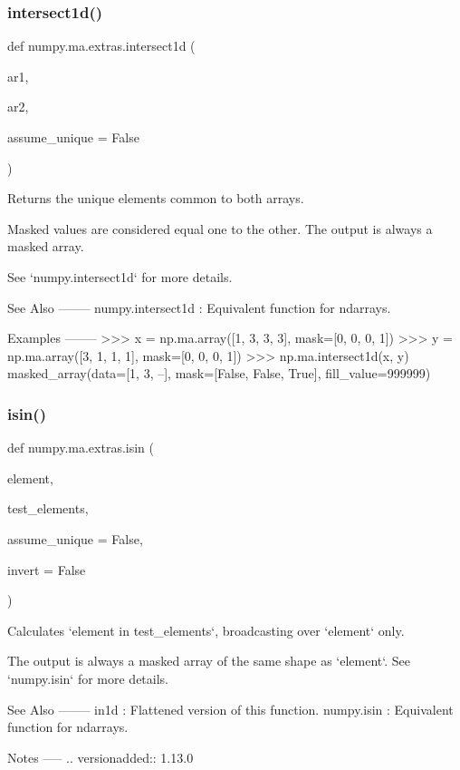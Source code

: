 \subsubsection{\texorpdfstring{intersect1d()}{intersect1d()}}
{\footnotesize\ttfamily def numpy.\+ma.\+extras.\+intersect1d (\begin{DoxyParamCaption}\item[{}]{ar1,  }\item[{}]{ar2,  }\item[{}]{assume\+\_\+unique = {\ttfamily False} }\end{DoxyParamCaption})}

\begin{DoxyVerb}Returns the unique elements common to both arrays.

Masked values are considered equal one to the other.
The output is always a masked array.

See `numpy.intersect1d` for more details.

See Also
--------
numpy.intersect1d : Equivalent function for ndarrays.

Examples
--------
>>> x = np.ma.array([1, 3, 3, 3], mask=[0, 0, 0, 1])
>>> y = np.ma.array([3, 1, 1, 1], mask=[0, 0, 0, 1])
>>> np.ma.intersect1d(x, y)
masked_array(data=[1, 3, --],
             mask=[False, False,  True],
       fill_value=999999)\end{DoxyVerb}
 \mbox{\label{namespacenumpy_1_1ma_1_1extras_a690428ae753e44d10b4b2b58ee4bb19f}} 
\subsubsection{\texorpdfstring{isin()}{isin()}}
{\footnotesize\ttfamily def numpy.\+ma.\+extras.\+isin (\begin{DoxyParamCaption}\item[{}]{element,  }\item[{}]{test\+\_\+elements,  }\item[{}]{assume\+\_\+unique = {\ttfamily False},  }\item[{}]{invert = {\ttfamily False} }\end{DoxyParamCaption})}

\begin{DoxyVerb}Calculates `element in test_elements`, broadcasting over
`element` only.

The output is always a masked array of the same shape as `element`.
See `numpy.isin` for more details.

See Also
--------
in1d       : Flattened version of this function.
numpy.isin : Equivalent function for ndarrays.

Notes
-----
.. versionadded:: 1.13.0\end{DoxyVerb}
 \mbox{\label{namespacenumpy_1_1ma_1_1extras_af0db0362baed65942454c90f46ec5225}} 
